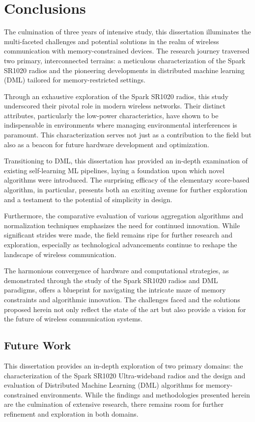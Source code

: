 \chapter{Conclusions}
\label{cha:conclusions}

The culmination of three years of intensive study, this dissertation illuminates the multi-faceted challenges and potential solutions in the realm of wireless communication with memory-constrained devices. The research journey traversed two primary, interconnected terrains: a meticulous characterization of the Spark SR1020 radios and the pioneering developments in distributed machine learning (DML) tailored for memory-restricted settings.

Through an exhaustive exploration of the Spark SR1020 radios, this study underscored their pivotal role in modern wireless networks. Their distinct attributes, particularly the low-power characteristics, have shown to be indispensable in environments where managing environmental interferences is paramount. This characterization serves not just as a contribution to the field but also as a beacon for future hardware development and optimization.

Transitioning to DML, this dissertation has provided an in-depth examination of existing self-learning ML pipelines, laying a foundation upon which novel algorithms were introduced. The surprising efficacy of the elementary score-based algorithm, in particular, presents both an exciting avenue for further exploration and a testament to the potential of simplicity in design.

Furthermore, the comparative evaluation of various aggregation algorithms and normalization techniques emphasizes the need for continued innovation. While significant strides were made, the field remains ripe for further research and exploration, especially as technological advancements continue to reshape the landscape of wireless communication.

The harmonious convergence of hardware and computational strategies, as demonstrated through the study of the Spark SR1020 radios and DML paradigms, offers a blueprint for navigating the intricate maze of memory constraints and algorithmic innovation. The challenges faced and the solutions proposed herein not only reflect the state of the art but also provide a vision for the future of wireless communication systems.

\section{Future Work}
This dissertation provides an in-depth exploration of two primary domains: the characterization of the Spark SR1020 Ultra-wideband radios and the design and evaluation of Distributed Machine Learning (DML) algorithms for memory-constrained environments. While the findings and methodologies presented herein are the culmination of extensive research, there remains room for further refinement and exploration in both domains.


